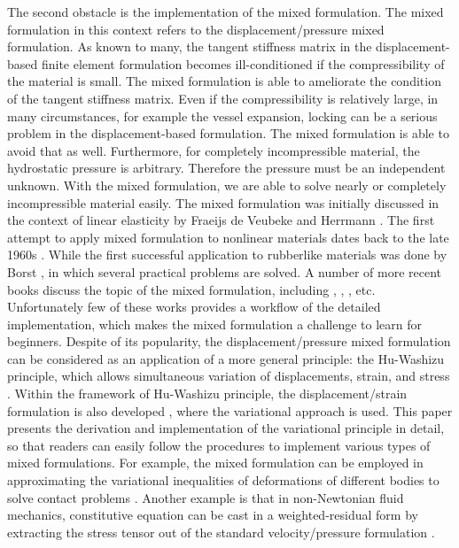The second obstacle is the implementation of the mixed formulation. The mixed formulation in this context  refers to the displacement/pressure mixed formulation. As known to many, the tangent stiffness matrix in the displacement-based finite element formulation becomes ill-conditioned if the compressibility of the material is small. The mixed formulation is able to ameliorate the condition of the tangent stiffness matrix. Even if the compressibility is relatively large, in many circumstances, for example the vessel expansion, locking can be a serious problem in the displacement-based formulation. The mixed formulation is able to avoid that as well. Furthermore, for completely incompressible material, the hydrostatic pressure is arbitrary. Therefore the pressure must be an independent unknown. With the mixed formulation, we are able to solve nearly or completely incompressible material easily. 
The mixed formulation was initially discussed in the context of linear elasticity by Fraeijs de Veubeke \cite{Veubeke} and Herrmann \cite{Herrmann}. The first attempt to apply mixed formulation to nonlinear materials dates back to the late 1960s \cite{Oden}. While the first successful application to rubberlike materials was done by Borst \cite{Borst}, in which several practical problems are solved. A number of more recent books discuss the topic of the mixed formulation, including \cite{Bathe}, \cite{Holzapfel}, \cite{Zienkiewicz}, etc. Unfortunately few of these works provides a workflow of the detailed implementation, which makes the mixed formulation a challenge to learn for beginners. Despite of its popularity, the displacement/pressure mixed formulation can be considered as an application of a more general principle: the Hu-Washizu principle, which allows simultaneous variation of displacements, strain, and stress \cite{Hu}. Within the framework of Hu-Washizu principle, the displacement/strain formulation is also developed \cite{Cervera, Rifai}, where the variational approach is used. This paper presents the derivation and implementation of the variational principle in detail, so that readers can easily follow the procedures to implement various types of mixed formulations. For example, the mixed formulation can be employed in approximating the variational inequalities of deformations of different bodies to solve contact problems \cite{Taylor}. Another example is that in non-Newtonian fluid mechanics, constitutive equation can be cast in a weighted-residual form by extracting the stress tensor out of the standard velocity/pressure formulation \cite{Baaijens}. 

